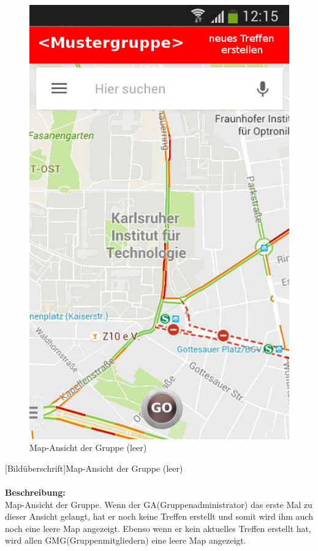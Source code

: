 \begin{figure}[H]
	\caption{Map-Ansicht der Gruppe (leer)}
\begin{center}
	\includegraphics[scale =0.5]{resources/images/map_leer_Admin.png}
\end{center}
\end{figure}
[Bildüberschrift]Map-Ansicht der Gruppe (leer)\\ \\
\textbf{Beschreibung:}\\
Map-Ansicht der Gruppe. Wenn der GA(Gruppenadministrator) das erste Mal zu dieser Ansicht gelangt, hat er noch keine Treffen erstellt und somit wird ihm auch noch eine leere Map angezeigt. Ebenso wenn er kein aktuelles Treffen erstellt hat, wird allen GMG(Gruppenmitgliedern) eine leere Map angezeigt.\\
